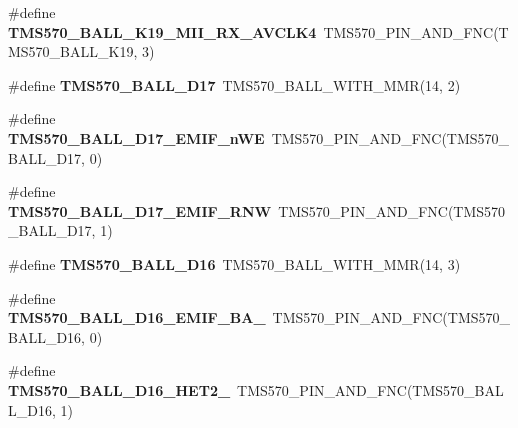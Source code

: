 \begin{DoxyCompactItemize}
\mbox{\label{tms570ls3137zwt-pins_8h_aaae16143c10b6497e2b0f1b6c610c0ff}} 
\#define {\bfseries T\+M\+S570\+\_\+\+B\+A\+L\+L\+\_\+\+K19\+\_\+\+M\+I\+I\+\_\+\+R\+X\+\_\+\+A\+V\+C\+L\+K4}~T\+M\+S570\+\_\+\+P\+I\+N\+\_\+\+A\+N\+D\+\_\+\+F\+NC(T\+M\+S570\+\_\+\+B\+A\+L\+L\+\_\+\+K19, 3)
\item 
\mbox{\label{tms570ls3137zwt-pins_8h_aea31f5590030120579731c866e51f5cd}} 
\#define {\bfseries T\+M\+S570\+\_\+\+B\+A\+L\+L\+\_\+\+D17}~T\+M\+S570\+\_\+\+B\+A\+L\+L\+\_\+\+W\+I\+T\+H\+\_\+\+M\+MR(14, 2)
\item 
\mbox{\label{tms570ls3137zwt-pins_8h_adc9d024fb3f0fee431a2fca7c95f1374}} 
\#define {\bfseries T\+M\+S570\+\_\+\+B\+A\+L\+L\+\_\+\+D17\+\_\+\+E\+M\+I\+F\+\_\+n\+WE}~T\+M\+S570\+\_\+\+P\+I\+N\+\_\+\+A\+N\+D\+\_\+\+F\+NC(T\+M\+S570\+\_\+\+B\+A\+L\+L\+\_\+\+D17, 0)
\item 
\mbox{\label{tms570ls3137zwt-pins_8h_ae2abb98dfc05507824654149e835779f}} 
\#define {\bfseries T\+M\+S570\+\_\+\+B\+A\+L\+L\+\_\+\+D17\+\_\+\+E\+M\+I\+F\+\_\+\+R\+NW}~T\+M\+S570\+\_\+\+P\+I\+N\+\_\+\+A\+N\+D\+\_\+\+F\+NC(T\+M\+S570\+\_\+\+B\+A\+L\+L\+\_\+\+D17, 1)
\item 
\mbox{\label{tms570ls3137zwt-pins_8h_a30cedbdacdafcc0c2a6b3c1ecfeaa678}} 
\#define {\bfseries T\+M\+S570\+\_\+\+B\+A\+L\+L\+\_\+\+D16}~T\+M\+S570\+\_\+\+B\+A\+L\+L\+\_\+\+W\+I\+T\+H\+\_\+\+M\+MR(14, 3)
\item 
\mbox{\label{tms570ls3137zwt-pins_8h_aa5e74a97beaf050242b01731548dc926}} 
\#define {\bfseries T\+M\+S570\+\_\+\+B\+A\+L\+L\+\_\+\+D16\+\_\+\+E\+M\+I\+F\+\_\+\+B\+A\+\_}~T\+M\+S570\+\_\+\+P\+I\+N\+\_\+\+A\+N\+D\+\_\+\+F\+NC(T\+M\+S570\+\_\+\+B\+A\+L\+L\+\_\+\+D16, 0)
\item 
\mbox{\label{tms570ls3137zwt-pins_8h_a8b2aa163a6e0673115406137e3d73399}} 
\#define {\bfseries T\+M\+S570\+\_\+\+B\+A\+L\+L\+\_\+\+D16\+\_\+\+H\+E\+T2\+\_}~T\+M\+S570\+\_\+\+P\+I\+N\+\_\+\+A\+N\+D\+\_\+\+F\+NC(T\+M\+S570\+\_\+\+B\+A\+L\+L\+\_\+\+D16, 1)
\item 
\mbox{\label{tms570ls3137zwt-pins_8h_aabfead7e57368d80c87606b0125733f3}} 

\end{DoxyCompactItemize}
